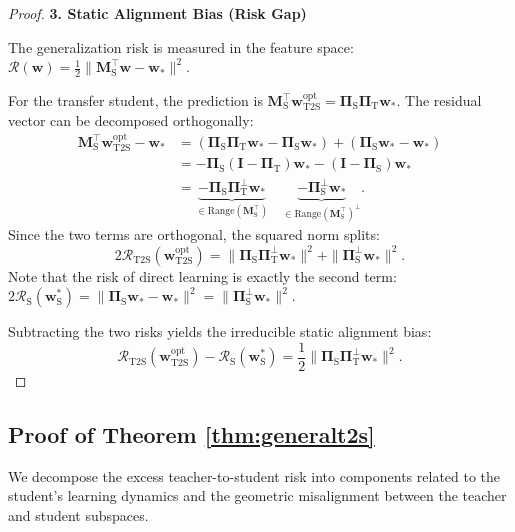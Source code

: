 \documentclass{article}
\theoremstyle{definition}
\theoremstyle{definition}
\theoremstyle{plain}
\theoremstyle{plain}
\theoremstyle{plain}
\theoremstyle{plain}
\theoremstyle{plain}
\newcommand{\bs}[1]{\boldsymbol{\mathbf{#1}}}
\newcommand{\te}{\mathrm{T}}
\newcommand{\st}{\mathrm{S}}
\newcommand{\ts}{\mathrm{T2S}}
\newcommand{\opt}{\mathrm{opt}}
\newcommand{\M}{\mathbf{M}}
\newcommand{\w}{\mathbf{w}}
\newcommand{\id}{\mathbf{I}}
\begin{document}
\begin{proof}
    \textbf{3. Static Alignment Bias (Risk Gap)}
    
    The generalization risk is measured in the feature space: $\mathcal{R}(\w) = \frac{1}{2} \| \M_\st^\top \w - \w_* \|^2$.
    
    For the transfer student, the prediction is $\M_\st^\top \w_{\ts}^\opt = \bs\Pi_\st \bs\Pi_\te \w_*$. The residual vector can be decomposed orthogonally:
    \begin{equation}
    \begin{aligned}
        \M_\st^\top \w_{\ts}^\opt - \w_* &= (\bs\Pi_\st \bs\Pi_\te \w_* - \bs\Pi_\st \w_*) + (\bs\Pi_\st \w_* - \w_*) \\
        &= -\bs\Pi_\st (\id - \bs\Pi_\te) \w_* - (\id - \bs\Pi_\st) \w_* \\
        &= \underbrace{-\bs\Pi_\st \bs\Pi_\te^\perp \w_*}_{\in \text{Range}(\M_\st^\top)} \quad \underbrace{-\bs\Pi_\st^\perp \w_*}_{\in \text{Range}(\M_\st^\top)^\perp}.
    \end{aligned}
    \end{equation}
    Since the two terms are orthogonal, the squared norm splits:
    \begin{equation}
        2\mathcal{R}_\ts(\w^\opt_\ts) = \| \bs\Pi_\st \bs\Pi_\te^\perp \w_* \|^2 + \| \bs\Pi_\st^\perp \w_* \|^2.
    \end{equation}
    Note that the risk of direct learning is exactly the second term: $2\mathcal{R}_\st(\w^*_\st) = \| \bs\Pi_\st \w_* - \w_* \|^2 = \| \bs\Pi_\st^\perp \w_* \|^2$.
    
    Subtracting the two risks yields the irreducible static alignment bias:
    \begin{equation}
        \mathcal{R}_\ts(\w^\opt_\ts) - \mathcal{R}_\st(\w^*_\st) = \frac{1}{2} \| \bs\Pi_\st \bs\Pi_\te^\perp \w_* \|^2.
    \end{equation}
\end{proof}

\subsection{Proof of Theorem \ref{thm:generalt2s}}
\label{subsec:proofgeneralt2s}

We decompose the excess teacher-to-student risk into components related to the student's learning dynamics and the geometric misalignment between the teacher and student subspaces.
\end{document}
